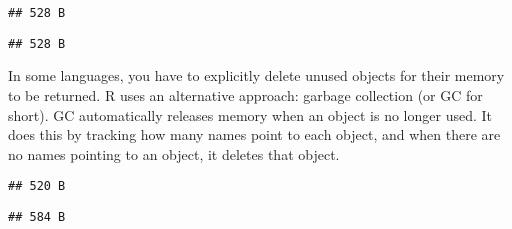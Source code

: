 \begin{Shaded}
\begin{Highlighting}[]
\NormalTok{(}\NormalTok{)}
\end{Highlighting}
\end{Shaded}

\begin{verbatim}
## 528 B
\end{verbatim}

\begin{Shaded}
\begin{Highlighting}[]
\NormalTok{(}\NormalTok{)}
\end{Highlighting}
\end{Shaded}

\begin{verbatim}
## 528 B
\end{verbatim}

In some languages, you have to explicitly delete unused objects for
their memory to be returned. R uses an alternative approach: garbage
collection (or GC for short). GC automatically releases memory when an
object is no longer used. It does this by tracking how many names point
to each object, and when there are no names pointing to an object, it
deletes that object. 

\begin{Shaded}
\begin{Highlighting}[]
\StringTok{ }\OperatorTok{:}\NormalTok{)}
\end{Highlighting}
\end{Shaded}

\begin{verbatim}
## 520 B
\end{verbatim}

\begin{Shaded}
\begin{Highlighting}[]
\StringTok{ }
\end{Highlighting}
\end{Shaded}

\begin{verbatim}
## 584 B
\end{verbatim}

\begin{Shaded}
\begin{Highlighting}[]
\NormalTok{(}
\end{Highlighting}
\end{Shaded}

